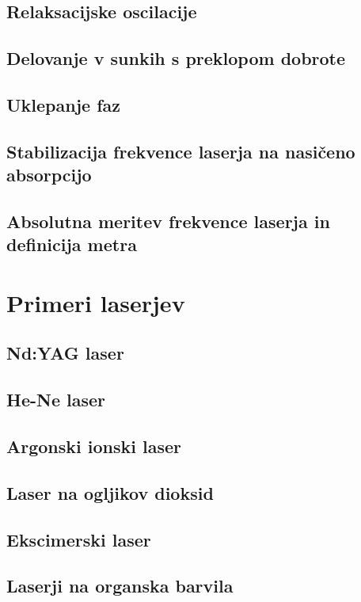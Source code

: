 \documentclass[11pt,fleqn]{book} %
\begin{document}
\section{Relaksacijske oscilacije}
\section{Delovanje v sunkih s preklopom dobrote}
\section{Uklepanje faz}
\section{Stabilizacija frekvence laserja na nasičeno absorpcijo}
\section{Absolutna meritev frekvence laserja in definicija metra}



%
\chapter{Primeri laserjev}
\section{Nd:YAG laser}
\section{He-Ne laser}
\section{Argonski ionski laser}
\section{Laser na ogljikov dioksid}
\section{Ekscimerski laser}
\section{Laserji na organska barvila}
\end{document}

